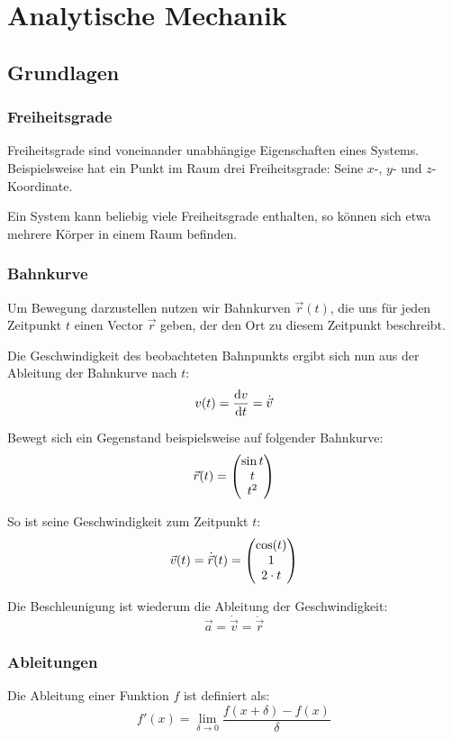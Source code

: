 \chapter{Analytische Mechanik}

\section{Grundlagen}

\subsection{Freiheitsgrade}
Freiheitsgrade sind voneinander unabhängige Eigenschaften eines Systems. Beispielsweise hat ein Punkt im Raum drei Freiheitsgrade: Seine $x$-, $y$- und $z$-Koordinate.

Ein System kann beliebig viele Freiheitsgrade enthalten, so können sich etwa mehrere Körper in einem Raum befinden.

\subsection{Bahnkurve}
Um Bewegung darzustellen nutzen wir Bahnkurven $\vec{r}(t)$, die uns für jeden Zeitpunkt $t$ einen Vector $\vec{r}$ geben, der den Ort zu diesem Zeitpunkt beschreibt.

Die Geschwindigkeit des beobachteten Bahnpunkts ergibt sich nun aus der Ableitung der Bahnkurve nach $t$:
\begin{equation}
 v(t) = \frac{\mathrm{d} v}{\mathrm{d}t} = \dot{\vec{v}}
\end{equation}

Bewegt sich ein Gegenstand beispielsweise auf folgender Bahnkurve:
\begin{equation}
 \vec{r}(t) = \begin{pmatrix} \sin{t} \\ t \\ t^2 \end{pmatrix}
\end{equation}

So ist seine Geschwindigkeit zum Zeitpunkt $t$:
\begin{equation}
\vec{v}(t) = \dot{\vec{r}}(t) = \begin{pmatrix} \cos(t) \\ 1 \\ 2\cdot t \end{pmatrix}
\end{equation}

Die Beschleunigung ist wiederum die Ableitung der Geschwindigkeit:
\begin{equation}
 \vec{a} = \dot{\vec{v}} = \ddot{\vec{r}}
\end{equation}

\subsection{Ableitungen}
Die Ableitung einer Funktion $f$ ist definiert als:
\begin{equation}
 f'(x) = \lim_{\delta \rightarrow 0} \frac{f(x+\delta) - f(x)}{\delta}
\end{equation}

